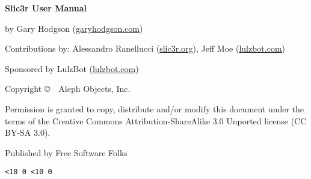 \clearpage\null\vfill
\begingroup
\thispagestyle{empty}
\footnotesize\raggedright
\setlength{\parskip}{0.5\baselineskip}

\textbf{Slic3r User Manual}

by Gary Hodgson (\href{http://garyhodgson.com}{garyhodgson.com})

Contributions by: Alessandro Ranellucci (\href{http://slic3r.org}{slic3r.org}), Jeff Moe (\href{http://lulzbot.com}{lulzbot.com})

Sponsored by LulzBot (\href{http://lulzbot.com}{lulzbot.com})

Copyright \copyright\ \the\year\ Aleph Objects, Inc.\par
Permission is granted to copy, distribute and\slash or modify
this document under the terms of the
Creative Commons Attribution-ShareAlike 3.0 Unported license
(CC BY-SA 3.0).

Published by Free Software Folks

\hfill\texttt{\the\year\ifnum\month<10 0\fi\the\month
                \ifnum\day  <10 0\fi\the\day}
\endgroup
\pagebreak{}
